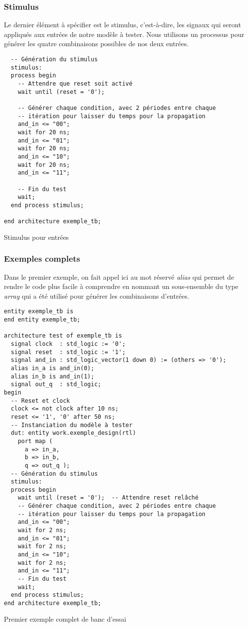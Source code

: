 \documentclass[11pt]{article}
\begin{document}
\subsubsection{Stimulus}
\label{sec:org04f8df5}

Le dernier élément à spécifier est le stimulus, c'est-à-dire, les
signaux qui seront appliqués aux entrées de notre modèle à
tester. Nous utilisons un processus pour générer les quatre
combinaisons possibles de nos deux entrées.

\begin{listing}[htbp]
\begin{verbatim}
  -- Génération du stimulus
  stimulus:
  process begin
    -- Attendre que reset soit activé
    wait until (reset = '0');

    -- Générer chaque condition, avec 2 périodes entre chaque
    -- itération pour laisser du temps pour la propagation
    and_in <= "00";
    wait for 20 ns;
    and_in <= "01";
    wait for 20 ns;
    and_in <= "10";
    wait for 20 ns;
    and_in <= "11";

    -- Fin du test
    wait;
  end process stimulus;

end architecture exemple_tb;
\end{verbatim}
\caption{Stimulus pour entrées}
\end{listing}

\subsubsection{Exemples complets}
\label{sec:orgaf11bc7}

Dans le premier exemple, on fait appel ici au mot réservé \emph{alias} qui
permet de rendre le code plus facile à comprendre en nommant un
sous-ensemble du type \emph{array} qui a été utilisé pour générer les
combinaisons d'entrées.

\begin{listing}[htbp]
\begin{verbatim}
entity exemple_tb is
end entity exemple_tb;

architecture test of exemple_tb is
  signal clock  : std_logic := '0';
  signal reset  : std_logic := '1';
  signal and_in : std_logic_vector(1 down 0) := (others => '0');
  alias in_a is and_in(0);
  alias in_b is and_in(1);
  signal out_q  : std_logic;
begin
  -- Reset et clock
  clock <= not clock after 10 ns;
  reset <= '1', '0' after 50 ns;
  -- Instanciation du modèle à tester 
  dut: entity work.exemple_design(rtl)
    port map (
      a => in_a,
      b => in_b,
      q => out_q );
  -- Génération du stimulus
  stimulus:
  process begin
    wait until (reset = '0');  -- Attendre reset relâché
    -- Générer chaque condition, avec 2 périodes entre chaque
    -- itération pour laisser du temps pour la propagation
    and_in <= "00";
    wait for 2 ns;
    and_in <= "01";
    wait for 2 ns;
    and_in <= "10";
    wait for 2 ns;
    and_in <= "11";
    -- Fin du test
    wait;
  end process stimulus;
end architecture exemple_tb;
\end{verbatim}
\caption{Premier exemple complet de banc d'essai}
\end{listing}
\end{document}
